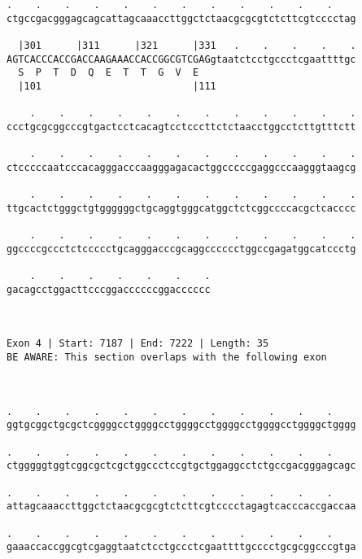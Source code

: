 \documentclass{article}
\begin{document}
\begin{Verbatim}
.    .    .    .    .    .    .    .    .    .    .    .    
ctgccgacgggagcagcattagcaaaccttggctctaacgcgcgtctcttcgtcccctag
                                                            
  |301      |311      |321      |331   .    .    .    .    .
AGTCACCCACCGACCAAGAAACCACCGGCGTCGAGgtaatctcctgccctcgaattttgc
  S  P  T  D  Q  E  T  T  G  V  E                           
  |101                          |111                        
  
    .    .    .    .    .    .    .    .    .    .    .    .
ccctgcgcggcccgtgactcctcacagtcctcccttctctaacctggcctcttgtttctt
                                                            
    .    .    .    .    .    .    .    .    .    .    .    .
ctcccccaatcccacagggacccaagggagacactggcccccgaggcccaagggtaagcg
                                                            
    .    .    .    .    .    .    .    .    .    .    .    .
ttgcactctgggctgtggggggctgcaggtgggcatggctctcggccccacgctcacccc
                                                            
    .    .    .    .    .    .    .    .    .    .    .    .
ggccccgccctctccccctgcagggacccgcaggcccccctggccgagatggcatccctg
                                                            
    .    .    .    .    .    .    .
gacagcctggacttcccggaccccccggacccccc
                                   
                                   
 
Exon 4 | Start: 7187 | End: 7222 | Length: 35
BE AWARE: This section overlaps with the following exon



.    .    .    .    .    .    .    .    .    .    .    .    
ggtgcggctgcgctcggggcctggggcctggggcctggggcctggggcctggggctgggg
                                                            
.    .    .    .    .    .    .    .    .    .    .    .    
ctgggggtggtcggcgctcgctggccctccgtgctggaggcctctgccgacgggagcagc
                                                            
.    .    .    .    .    .    .    .    .    .    .    .    
attagcaaaccttggctctaacgcgcgtctcttcgtcccctagagtcacccaccgaccaa
                                                            
.    .    .    .    .    .    .    .    .    .    .    .    
gaaaccaccggcgtcgaggtaatctcctgccctcgaattttgcccctgcgcggcccgtga
                                                            

\end{Verbatim}
\end{document}
